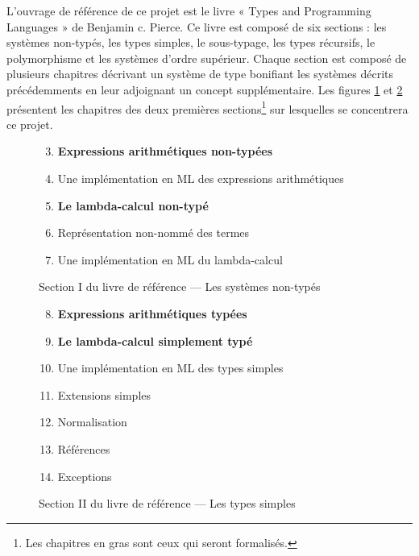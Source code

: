 \documentclass[a4paper, oneside, 12pt, titlepage, draft]{article}
\begin{document}
%

L'ouvrage de référence de ce projet est le livre « Types and Programming Languages » de Benjamin c.
Pierce. Ce livre est composé de six sections : les systèmes non-typés, les types simples, le
sous-typage, les types récursifs, le polymorphisme et les systèmes d'ordre supérieur. Chaque section
est composé de plusieurs chapitres décrivant un système de type bonifiant les systèmes décrits
précédemments en leur adjoignant un concept supplémentaire. Les figures \ref{fig:TAPL-section-1} et
\ref{fig:TAPL-section-2} présentent les chapitres des deux premières sections\footnote{Les chapitres
en gras sont ceux qui seront formalisés.} sur lesquelles se concentrera ce projet.


\begin{figure}[h]
  \begin{center}
    \begin{enumerate}[label=§\arabic*]
        \setcounter{enumi}{2}
      \item \textbf{Expressions arithmétiques non-typées}
      \item Une implémentation en ML des expressions arithmétiques
      \item \textbf{Le lambda-calcul non-typé}
      \item Représentation non-nommé des termes
      \item Une implémentation en ML du lambda-calcul
    \end{enumerate}
  \end{center}
  \caption{Section I du livre de référence --- Les systèmes non-typés}
  \label{fig:TAPL-section-1}
\end{figure}

\begin{figure}[h]
  \begin{center}
    \begin{enumerate}[label=§\arabic*]
        \setcounter{enumi}{7}
      \item \textbf{Expressions arithmétiques typées}
      \item \textbf{Le lambda-calcul simplement typé}
      \item Une implémentation en ML des types simples
      \item Extensions simples
      \item Normalisation
      \item Références
      \item Exceptions
    \end{enumerate}
  \end{center}
  \caption{Section II du livre de référence --- Les types simples}
  \label{fig:TAPL-section-2}
\end{figure}
\end{document}

